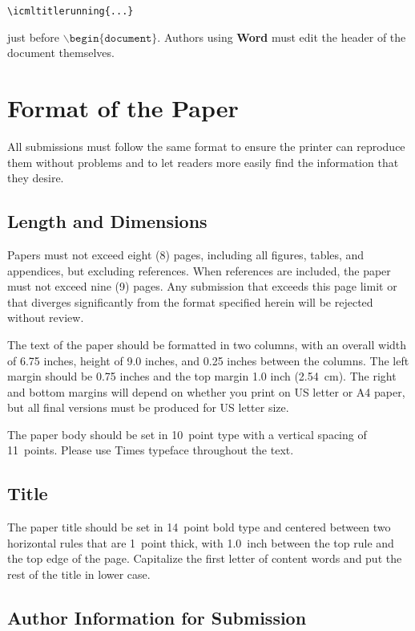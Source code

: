 \documentclass{article}
\begin{document}
\verb|\icmltitlerunning{...}|

just before $\mathtt{\backslash begin\{document\}}$.
Authors using \textbf{Word} must edit the header of the document themselves.

\section{Format of the Paper} 
 
All submissions must follow the same format to ensure the printer can
reproduce them without problems and to let readers more easily find
the information that they desire.

\subsection{Length and Dimensions}

Papers must not exceed eight (8) pages, including all figures, tables,
and appendices, but excluding references. When references are included,
the paper must not exceed nine (9) pages. Any submission that exceeds 
this page limit or that diverges significantly from the format specified 
herein will be rejected without review.

The text of the paper should be formatted in two columns, with an
overall width of 6.75 inches, height of 9.0 inches, and 0.25 inches
between the columns. The left margin should be 0.75 inches and the top
margin 1.0 inch (2.54~cm). The right and bottom margins will depend on
whether you print on US letter or A4 paper, but all final versions
must be produced for US letter size.

The paper body should be set in 10~point type with a vertical spacing
of 11~points. Please use Times  typeface throughout the text.

\subsection{Title}

The paper title should be set in 14~point bold type and centered
between two horizontal rules that are 1~point thick, with 1.0~inch
between the top rule and the top edge of the page. Capitalize the
first letter of content words and put the rest of the title in lower
case.

\subsection{Author Information for Submission}
\label{author info}
\end{document}
